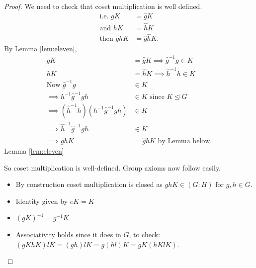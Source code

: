 \begin{proof}

We need to check that coset multiplication is well defined.
\begin{align*}
    \text{i.e. } gK &= \hat{g}K \\
    \text{and } hK &= \hat{h}K \\
    \text{then } ghK &= \hat{g} \hat{h} K.
\end{align*}
By Lemma \ref{lem:eleven},
\begin{align*}
    gK &= \hat{g} K \implies \hat{g}^{-1} g \in K \\
    hK &= \hat{h} K \implies \hat{h}^{-1} h \in K \\
    \text{Now } \hat{g}^{-1} g &\in K \\
    \implies h^{-1} \hat{g}^{-1} g h &\in K \text{ since } K \trianglelefteq G \\
    \implies (\hat{h}^{-1} h) (h^{-1} \hat{g}^{-1} g h) &\in K \\
    \implies \hat{h}^{-1}\hat{g}^{-1} g h &\in K \\
    \implies ghK &= \hat{g} \hat{h} K \text{ by Lemma below}.
\end{align*} Lemma \ref{lem:eleven}

So coset multiplication is well-defined.
Group axioms now follow easily.

\begin{itemize}
\item
  By construction coset multiplication is closed as \(ghK \in (G : H)\) for \(g, h \in G\).
\item
  Identity given by \(eK = K\)
\item
  \((gK)^{-1} = g^{-1} K\)
\item
  Associativity holds since it does in \(G\), to check:
  \((gK hK) lK = (gh)l K = g(hl)K = gK (hK lK)\).
\end{itemize}

\end{proof}

